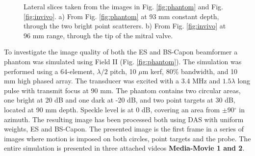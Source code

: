\documentclass[journal]{IEEEtran}
\newcommand{\degree}{\ensuremath{^\circ}}
\newcommand\multimedia[1]{\textbf{{\color{red}#1}}}
\begin{document}
\begin{figure}[!t]
\centerline{
\hfil
{}
}
\caption{Lateral slices taken from the images in Fig. \ref{fig:phantom} and Fig. \ref{fig:invivo}. a) From Fig. \ref{fig:phantom} at 93 mm constant depth, through the two bright point scatterers. b) From Fig. \ref{fig:invivo} at 96 mm range, through the tip of the mitral valve.}
\label{fig:slices}
\end{figure}

To investigate the image quality of both the ES and BS-Capon beamformer a phantom was simulated using Field II \cite{Jensen1992, Jensen1996a} (Fig. \ref{fig:phantom}). The simulation was performed using a 64-element, $\lambda/2$ pitch, 10 $\mu$m kerf, 80\% bandwidth, and 10 mm high phased array. The transducer was excited with a 3.4 MHz and $1.5\lambda$ long pulse with transmit focus at 90 mm. The phantom contains two circular areas, one bright at 20 dB and one dark at -20 dB, and two point targets at 30 dB, located at 90 mm depth. Speckle level is at 0 dB, covering an area from $\pm90\degree$ in azimuth. The resulting image has been processed both using DAS with uniform weights, ES and BS-Capon. The presented image is the first frame in a series of images where motion is imposed on both circles, point targets and the probe. The entire simulation is presented in three attached videos \multimedia{Media-Movie 1 and 2}.
\end{document}
